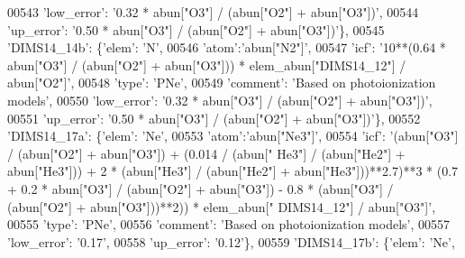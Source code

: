 \begin{DoxyCode}
00543                                        \textcolor{stringliteral}{'low\_error'}: \textcolor{stringliteral}{'0.32 * abun["O3"] / (abun["O2"] + abun["O3"])'},
00544                                        \textcolor{stringliteral}{'up\_error'}: \textcolor{stringliteral}{'0.50 * abun["O3"] / (abun["O2"] + abun["O3"])'}\},
00545                          \textcolor{stringliteral}{'DIMS14\_14b'}: \{\textcolor{stringliteral}{'elem'}: \textcolor{stringliteral}{'N'},
00546                                        \textcolor{stringliteral}{'atom'}:\textcolor{stringliteral}{'abun["N2"]'}, 
00547                                        \textcolor{stringliteral}{'icf'}: \textcolor{stringliteral}{'10**(0.64 * abun["O3"] / (abun["O2"] + abun["O3"])) *
       elem\_abun["DIMS14\_12"] / abun["O2"]'},
00548                                        \textcolor{stringliteral}{'type'}: \textcolor{stringliteral}{'PNe'},
00549                                        \textcolor{stringliteral}{'comment'}: \textcolor{stringliteral}{'Based on photoionization models'},
00550                                        \textcolor{stringliteral}{'low\_error'}: \textcolor{stringliteral}{'0.32 * abun["O3"] / (abun["O2"] + abun["O3"])'},
00551                                        \textcolor{stringliteral}{'up\_error'}: \textcolor{stringliteral}{'0.50 * abun["O3"] / (abun["O2"] + abun["O3"])'}\},
00552                          \textcolor{stringliteral}{'DIMS14\_17a'}: \{\textcolor{stringliteral}{'elem'}: \textcolor{stringliteral}{'Ne'},
00553                                        \textcolor{stringliteral}{'atom'}:\textcolor{stringliteral}{'abun["Ne3"]'}, 
00554                                        \textcolor{stringliteral}{'icf'}: \textcolor{stringliteral}{'(abun["O3"] / (abun["O2"] + abun["O3"]) + (0.014 / (abun["
      He3"] / (abun["He2"] + abun["He3"])) + 2 * (abun["He3"] / (abun["He2"] + abun["He3"]))**2.7)**3 * (0.7 + 0.2 *
       abun["O3"] / (abun["O2"] + abun["O3"]) - 0.8 * (abun["O3"] / (abun["O2"] + abun["O3"]))**2)) * elem\_abun["
      DIMS14\_12"] / abun["O3"]'},
00555                                        \textcolor{stringliteral}{'type'}: \textcolor{stringliteral}{'PNe'},
00556                                        \textcolor{stringliteral}{'comment'}: \textcolor{stringliteral}{'Based on photoionization models'},
00557                                        \textcolor{stringliteral}{'low\_error'}: \textcolor{stringliteral}{'0.17'},
00558                                        \textcolor{stringliteral}{'up\_error'}: \textcolor{stringliteral}{'0.12'}\},
00559                          \textcolor{stringliteral}{'DIMS14\_17b'}: \{\textcolor{stringliteral}{'elem'}: \textcolor{stringliteral}{'Ne'},

\end{DoxyCode}
